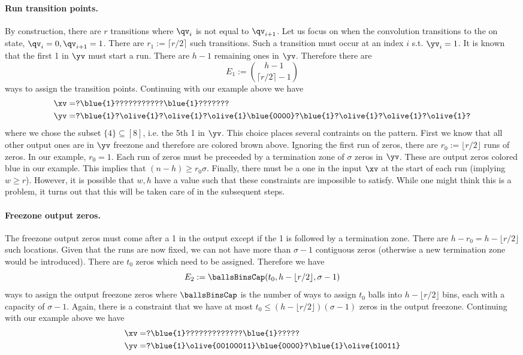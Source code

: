 \paragraph{Run transition points.} By construction, there are $r$ transitions where $\qv_{i}$ is not equal to $\qv_{i+1}$. Let us focus on when the convolution transitions to the on state, $\qv_i=0,\qv_{i+1}=1$. There are $r_1:=\lceil r/2\rceil$ such transitions. Such a transition must occur at an index $i$ s.t. $\yv_i=1$. It is known that the first 1 in $\yv$ must start a run. There are $h-1$ remaining ones in  $\yv$. Therefore there are
$$
E_1:=\binom{h-1}{\lceil r/2\rceil-1}
$$
ways to assign the transition points.
Continuing with our example above we have
\begin{align*}
    \xv=&\texttt{?\blue{1}???????????\blue{1}???????}\\
    \yv=&\texttt{?\blue{1}?\olive{1}?\olive{1}?\olive{1}\blue{0000}?\blue{1}?\olive{1}?\olive{1}?\olive{1}?}
\end{align*}
where we chose the subset $\{4\}\subseteq[8]$, i.e. the 5th 1 in $\yv$. This choice places several contraints on the pattern. First we know that all other output ones are in $\yv$ freezone and therefore are colored brown above. Ignoring the first run of zeros, there are $r_0:=\lfloor r/2\rfloor$ runs of zeros. In our example, $r_0=1$. Each run of zeros must be preceeded by a termination zone of $\sigma$ zeros in $\yv$. These are output zeros colored blue in our example. This implies that $(n-h)\geq r_0\sigma$. Finally, there must be a one in the input $\xv$ at the start of each run (implying $w\geq r$). However, it is possible that $w,h$ have a value such that these constraints are impossible to satisfy. While one might think this is a problem, it turns out that this will be taken care of in the subsequent steps.

\paragraph{Freezone output zeros.} The freezone output zeros must come after a 1 in the output except if the 1 is followed by a termination zone. There are $h-r_0=h-\lfloor r/2\rfloor$ such locations. Given that the runs are now fixed, we can not have more than $\sigma-1$ contiguous zeros (otherwise a new termination zone would be introduced). There are $t_0$ zeros which need to be assigned. Therefore we have
$$
    E_2:=\ballsBinsCap(t_0, h-\lfloor r/2\rfloor, \sigma-1)
$$
ways to assign the output freezone zeros where $\ballsBinsCap$ is the number of ways to assign $t_0$ balls into $h-\lfloor r/2\rfloor$ bins, each with a capacity of $\sigma-1$.
Again, there is a constraint that we have at most $t_0\leq (h-\lfloor r/2\rfloor)(\sigma-1)$ zeros in the output freezone.
Continuing with our example above we have
\begin{align*}
    \xv=&\texttt{?\blue{1}?????????????\blue{1}?????}\\
    \yv=&\texttt{?\blue{1}\olive{00100011}\blue{0000}?\blue{1}\olive{10011}}
\end{align*}


